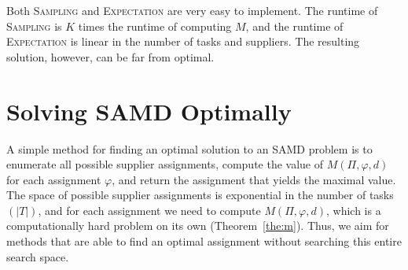 \documentclass[letterpaper]{article} %
\newtheorem{conjecture}{Conjecture}
\newcommand{\samd}{\ac{SAMD}\xspace}
\newcommand{\astar}{\textsc{A*}\xspace}
\newcommand{\sampling}{\textsc{Sampling}\xspace}
\newcommand{\expectation}{\textsc{Expectation}\xspace}
\begin{document}
Both \sampling and \expectation are very easy to implement. The runtime of \sampling is $K$ times the runtime of computing $M$, and the runtime of \expectation is linear in the number of tasks and suppliers. The resulting solution, however, can be far from optimal. 


\section{Solving \samd Optimally}\label{sec:opt}



A simple method for finding an optimal solution to an \samd problem is to enumerate all possible supplier assignments, 
compute the value of $M(\Pi,\varphi, d)$ for each assignment $\varphi$, and return the assignment that yields the maximal value. 
The space of possible supplier assignments is exponential in the number of tasks $(|T|)$, and for each assignment we need to compute $M(\Pi, \varphi, d)$, which is a computationally hard problem on its own (Theorem~\ref{the:m}). 
Thus, we aim for methods that are able to find an optimal assignment without searching this entire search space. 




\end{document}

